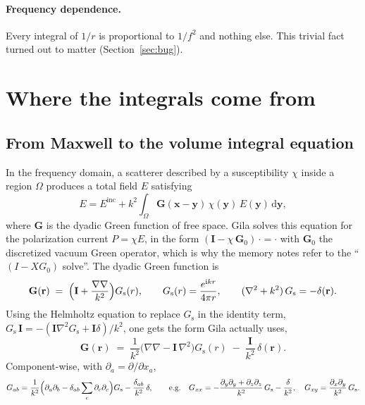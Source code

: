 \documentclass[11pt]{article}
\theoremstyle{remark}
\newcommand{\dd}{\mathrm{d}}
\newcommand{\ii}{\mathrm{i}}
\newcommand{\Gs}{G_{\mathrm{s}}}
\begin{document}
\paragraph{Frequency dependence.} Every integral of $1/r$ is proportional to $1/f^2$
and nothing else. This trivial fact turned out to matter (Section~\ref{sec:bug}).

\section{Where the integrals come from}
\label{sec:origin}

\subsection{From Maxwell to the volume integral equation}

In the frequency domain, a scatterer described by a susceptibility $\chi$ inside a
region $\Omega$ produces a total field $E$ satisfying
\begin{equation}
E = E^{\mathrm{inc}} + k^2 \int_{\Omega} \mathbf{G}(\mathbf{x}-\mathbf{y})\,
\chi(\mathbf{y})\, E(\mathbf{y})\,\dd\mathbf{y},
\end{equation}
where $\mathbf{G}$ is the dyadic Green function of free space. Gila solves this
equation for the polarization current $P = \chi E$, in the form
$(\mathbf{I} - \chi\,\mathbf{G}_0)\,\cdot = \cdot$ with $\mathbf{G}_0$ the
discretized vacuum Green operator, which is why the memory notes refer to the
``$(I - X G_0)$ solve''. The dyadic Green function is
\begin{equation}
\mathbf{G}(\mathbf{r}) \;=\; \Bigl(\mathbf{I} + \frac{\nabla\nabla}{k^2}\Bigr)\Gs(r),
\qquad
\Gs(r) = \frac{e^{\ii k r}}{4\pi r},
\qquad (\nabla^2 + k^2)\,\Gs = -\delta(\mathbf{r}).
\label{eq:dyadic}
\end{equation}
Using the Helmholtz equation to replace $\Gs$ in the identity term,
$\Gs\,\mathbf{I} = -(\mathbf{I}\nabla^2 \Gs + \mathbf{I}\delta)/k^2$, one gets the
form Gila actually uses,
\begin{equation}
\mathbf{G}(\mathbf{r}) \;=\; \frac{1}{k^2}\bigl(\nabla\nabla - \mathbf{I}\,\nabla^2\bigr)\Gs(r)
\;-\; \frac{\mathbf{I}}{k^2}\,\delta(\mathbf{r}).
\label{eq:curlcurl}
\end{equation}
Component-wise, with $\partial_a = \partial/\partial x_a$,
\begin{equation}
G_{ab} = \frac{1}{k^2}\Bigl(\partial_a\partial_b - \delta_{ab}\sum_c \partial_c\partial_c\Bigr)\Gs - \frac{\delta_{ab}}{k^2}\,\delta,
\qquad\text{e.g.}\quad
G_{xx} = -\frac{\partial_y\partial_y + \partial_z\partial_z}{k^2}\,\Gs - \frac{\delta}{k^2},
\quad
G_{xy} = \frac{\partial_x\partial_y}{k^2}\,\Gs .
\end{equation}
\end{document}
